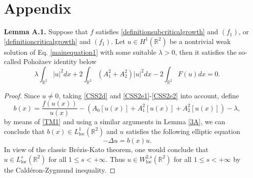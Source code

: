 \documentclass[11pt]{amsart}
\numberwithin{equation}{section}
\theoremstyle{definition}
\newcommand{\R}{\mathbb{R}}
\begin{document}
\section*{Appendix}

\noindent \textbf{Lemma A.1.}
Suppose that $f$ satisfies \eqref{definitionsubcriticalgrowth} and $(f_1)$, or
\eqref{definitioncriticalgrowth} and $(f_1)$. Let $u\in H^1(\R^2)$ be a
nontrivial weak solution of Eq. \eqref{mainequation1} with some suitable $\lambda>0$,
then it satisfies the so-called Poho\u{z}aev identity below
\[
 \lambda\int_{\R^2}|u|^2dx
 +2\int_{\R^2}(A_1^2+A_2^2)|u|^2dx-2\int_{\R^2}F(u)dx
=0.
\]


\begin{proof}
Since $u\neq0$, taking \eqref{CSS2d} and \eqref{CSS2e1}-\eqref{CSS2e2} into account,
 define
\[
b(x)=\frac{f(u(x))}{u(x)}-(A_0[u(x)]+A_1^2[u(x)]+A_2^2[u(x)])-\lambda,
\]
by means of \eqref{TM1} and using a similar arguments in Lemma \ref{3A},
we can conclude that $b(x)\in L_{\text{loc}}^1(\R^2)$
and $u$ satisfies the following elliptic equation
 $$
-\Delta u= b(x)u.
$$
In view of the classic Br\'{e}zis-Kato theorem,
one would conclude that $u\in L_{\text{loc}}^s(\R^2)$ for all $1\leq s<+\infty$.
Thus $u\in W^{2.s}_{\text{loc}}(\R^2)$ for all $1\leq s<+\infty$
by the Cald\'{e}ron-Zygmund inequality.


\end{proof}
\end{document}
